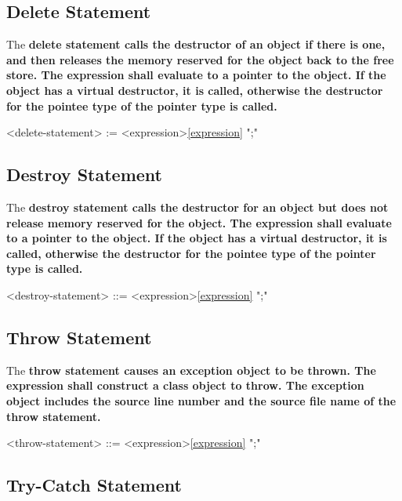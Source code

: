 \documentclass[a4paper,oneside,11pt]{article}
\begin{document}
\subsection{Delete Statement}

The \bf{delete} statement calls the destructor of an object if there is one, and then releases the memory reserved for the object back to the free store.
The expression shall evaluate to a pointer to the object.
If the object has a virtual destructor, it is called, otherwise the destructor for the pointee type of the pointer type is called.

\begin{grammar}
\label{delete-statement}<delete-statement> :=  <expression>\ref{expression} ";"
\end{grammar}

\subsection{Destroy Statement}

The \bf{destroy} statement calls the destructor for an object but does not release memory reserved for the object.
The expression shall evaluate to a pointer to the object.
If the object has a virtual destructor, it is called, otherwise the destructor for the pointee type of the pointer type is called.

\begin{grammar}
\label{destroy-statement}<destroy-statement> ::=  <expression>\ref{expression} ";"
\end{grammar}

\subsection{Throw Statement}

The \bf{throw} statement causes an exception object to be thrown. The expression shall construct a class object to throw.
The exception object includes the source line number and the source file name of the throw statement.

\begin{grammar}
\label{throw-statement}<throw-statement> ::=  <expression>\ref{expression} ";"
\end{grammar}

\subsection{Try-Catch Statement}
\end{document}
